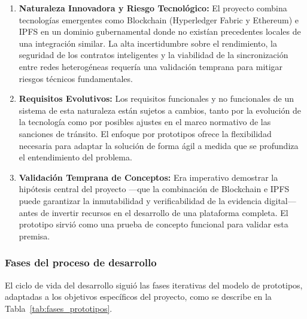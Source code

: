 \begin{enumerate}
    \item \textbf{Naturaleza Innovadora y Riesgo Tecnológico:} El proyecto combina tecnologías emergentes como Blockchain (Hyperledger Fabric y Ethereum) e IPFS en un dominio gubernamental donde no existían precedentes locales de una integración similar. La alta incertidumbre sobre el rendimiento, la seguridad de los contratos inteligentes y la viabilidad de la sincronización entre redes heterogéneas requería una validación temprana para mitigar riesgos técnicos fundamentales.
    
    \item \textbf{Requisitos Evolutivos:} Los requisitos funcionales y no funcionales de un sistema de esta naturaleza están sujetos a cambios, tanto por la evolución de la tecnología como por posibles ajustes en el marco normativo de las sanciones de tránsito. El enfoque por prototipos ofrece la flexibilidad necesaria para adaptar la solución de forma ágil a medida que se profundiza el entendimiento del problema.
    
    \item \textbf{Validación Temprana de Conceptos:} Era imperativo demostrar la hipótesis central del proyecto —que la combinación de Blockchain e IPFS puede garantizar la inmutabilidad y verificabilidad de la evidencia digital— antes de invertir recursos en el desarrollo de una plataforma completa. El prototipo sirvió como una prueba de concepto funcional para validar esta premisa.
\end{enumerate}

\subsubsection{Fases del proceso de desarrollo}

El ciclo de vida del desarrollo siguió las fases iterativas del modelo de prototipos, adaptadas a los objetivos específicos del proyecto, como se describe en la Tabla~\ref{tab:fases_prototipos}.

